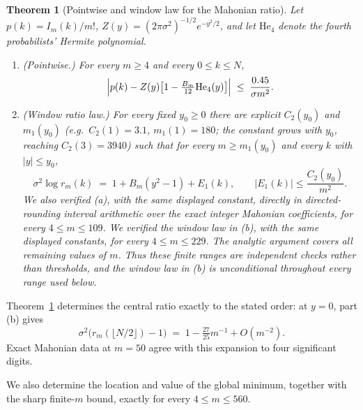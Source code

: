 \documentclass[11pt]{amsart}
\theoremstyle{plain}
\newtheorem{theorem}{Theorem}[section]
\theoremstyle{definition}
\theoremstyle{remark}
\begin{document}
\begin{theorem}[Pointwise and window law for the Mahonian ratio]
\label{thm:G1}
Let $p(k)=I_m(k)/m!$, $Z(y)=(2\pi\sigma^2)^{-1/2}e^{-y^2/2}$, and let
$\mathrm{He}_4$ denote the fourth probabilists' Hermite polynomial.
\begin{enumerate}[label=(\alph*)]
\item \textup{(Pointwise.)} For every $m\ge4$ and every $0\le k\le N$,
\[
\Bigl| p(k) - Z(y)\bigl[1-\tfrac{B_m}{12}\mathrm{He}_4(y)\bigr] \Bigr|
\;\le\; \frac{0.45}{\sigma m^2}.
\]
\item \textup{(Window ratio law.)} For every fixed $y_0\ge0$ there are
explicit $C_2(y_0)$ and $m_1(y_0)$ (e.g.\ $C_2(1)=3.1$, $m_1(1)=180$; the constant grows with $y_0$, reaching $C_2(3)=3940$) such that for every $m\ge
m_1(y_0)$ and every $k$ with $|y|\le y_0$,
\[
\sigma^2\log r_m(k) \;=\; 1+B_m(y^2-1)+E_1(k), \qquad |E_1(k)|\le
\frac{C_2(y_0)}{m^2}.
\]
We also verified (a), with the same displayed constant, directly in
directed-rounding interval arithmetic over the exact integer Mahonian
coefficients, for every $4\le m\le109$. We verified the window law in (b),
with the same displayed constants, for every $4\le m\le229$. The analytic
argument covers all remaining values of $m$. Thus these finite
ranges are independent checks rather than thresholds, and the window law
in (b) is unconditional throughout every range used below.
\end{enumerate}
\end{theorem}

Theorem~\ref{thm:G1} determines the central ratio exactly to the stated
order: at $y=0$, part (b) gives
\begin{equation}
\label{eq:central-ratio}
\sigma^2\bigl(r_m(\lfloor N/2\rfloor)-1\bigr) \;=\; 1-\tfrac{27}{25}m^{-1}+O(m^{-2}).
\end{equation}
Exact Mahonian data at $m=50$ agree with this expansion to four significant
digits.

We also determine the location and value of the global minimum, together
with the sharp finite-$m$ bound, exactly for every $4\le m\le560$.
\end{document}
